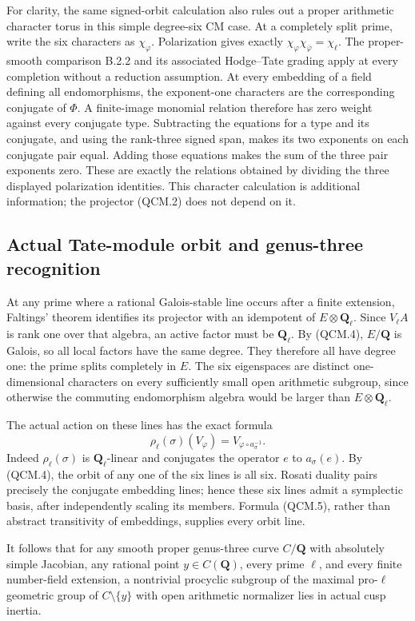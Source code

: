 For clarity, the same signed-orbit calculation also
rules out a proper arithmetic character torus in this
simple degree-six CM case. At a completely split prime,
write the six characters as $\chi_\varphi$. Polarization
gives exactly
$\chi_\varphi\chi_{\bar\varphi}=\chi_\ell$.
The proper-smooth comparison B.2.2 and its associated
Hodge--Tate grading apply at every completion without a
reduction assumption. At every embedding of a field
defining all endomorphisms, the exponent-one characters
are the corresponding conjugate of $\Phi$.
A finite-image monomial relation therefore has zero
weight against every conjugate type. Subtracting the
equations for a type and its conjugate, and using the
rank-three signed span, makes its two exponents on
each conjugate pair equal. Adding those equations makes
the sum of the three pair exponents zero. These are
exactly the relations obtained by dividing the three
displayed polarization identities. This character
calculation is additional information; the projector
(QCM.2) does not depend on it.

\subsection*{Actual Tate-module orbit and genus-three recognition}
At any prime where a rational Galois-stable line occurs
after a finite extension, Faltings' theorem identifies
its projector with an idempotent of $E\otimes\mathbf Q_\ell$.
Since $V_\ell A$ is rank one over that algebra, an active
factor must be $\mathbf Q_\ell$. By (QCM.4), $E/\mathbf Q$
is Galois, so all local factors have the same degree.
They therefore all have degree one: the prime splits
completely in $E$. The six eigenspaces are distinct
one-dimensional characters on every sufficiently small
open arithmetic subgroup, since otherwise the
commuting endomorphism algebra would be larger than
$E\otimes\mathbf Q_\ell$.

The actual action on these lines has the exact formula
\[
 \rho_\ell(\sigma)(V_\varphi)
                     =V_{\varphi\circ a_\sigma^{-1}}.       \tag{QCM.5}
\]
Indeed $\rho_\ell(\sigma)$ is $\mathbf Q_\ell$-linear
and conjugates the operator $e$ to $a_\sigma(e)$.
By (QCM.4), the orbit of any one of the six lines is
all six. Rosati duality pairs precisely the conjugate
embedding lines; hence these six lines admit a
symplectic basis, after independently scaling its
members. Formula (QCM.5), rather than abstract
transitivity of embeddings, supplies every orbit line.

It follows that for any smooth proper genus-three
curve $C/\mathbf Q$ with absolutely simple Jacobian,
any rational point $y\in C(\mathbf Q)$, every prime
$\ell$, and every finite number-field extension, a
nontrivial procyclic subgroup of the maximal pro-$\ell$
geometric group of $C\setminus\{y\}$ with open
arithmetic normalizer lies in actual cusp inertia.

